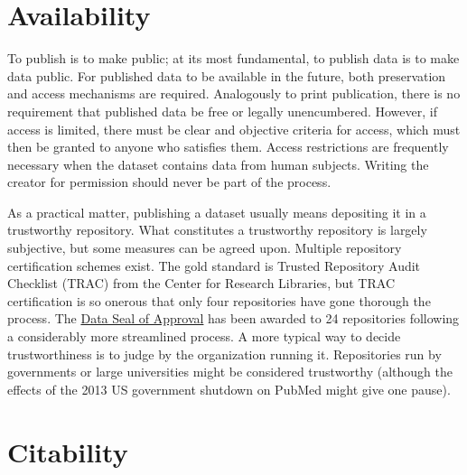 \documentclass[10pt,a4paper,twocolumn]{article}
\begin{document}

\section*{Availability}\label{availability}

To publish is to make public; at its most fundamental, to publish data is to make data public. 
For published data to be available in the future, both preservation and access mechanisms are required. %
Analogously to print publication, there is no requirement that published data be free or legally unencumbered.
However, if access is limited, there must be clear and objective criteria for access, which must then be granted to anyone who satisfies them. %
Access restrictions are frequently necessary when the dataset contains data from human subjects. %
Writing the creator for permission should never be part of the process. %

As a practical matter, publishing a dataset usually means depositing it in a trustworthy repository. 
What constitutes a trustworthy repository is largely subjective, but some measures can be agreed upon. 
Multiple repository certification schemes exist.
The gold standard is Trusted Repository Audit Checklist (TRAC)\cite{trac_2007} from the Center for Research Libraries, but TRAC certification is so onerous that only four repositories have gone thorough the process.  %
The \href{http://datasealofapproval.org/}{Data Seal of Approval} has been awarded to 24 repositories following a considerably more streamlined process. %
A more typical way to decide trustworthiness is to judge by the organization running it. 
Repositories run by governments or large universities might be considered trustworthy (although the effects of the 2013 US government shutdown on PubMed might give one pause). %


\section*{Citability}\label{citability}
\end{document}
